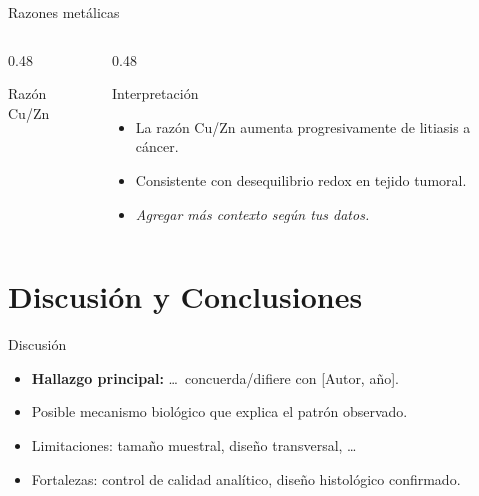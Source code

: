 \documentclass[aspectratio=169, 11pt]{beamer}
\begin{document}
\begin{frame}{Razones metálicas}
  \begin{columns}[T]
    \begin{column}{0.48\textwidth}
      \begin{center}
        {\small Razón Cu/Zn}
      \end{center}
    \end{column}
    \begin{column}{0.48\textwidth}
      \begin{exampleblock}{Interpretación}
        \begin{itemize}
          \item La razón Cu/Zn aumenta progresivamente de litiasis a cáncer.
          \item Consistente con desequilibrio redox en tejido tumoral.
          \item \textit{Agregar más contexto según tus datos.}
        \end{itemize}
      \end{exampleblock}
    \end{column}
  \end{columns}
\end{frame}

\section{Discusión y Conclusiones}

\begin{frame}{Discusión}
  \begin{itemize}
    \item \textbf{Hallazgo principal:} \ldots\ concuerda/difiere con [Autor, año].
    \item Posible mecanismo biológico que explica el patrón observado.
    \item Limitaciones: tamaño muestral, diseño transversal, \ldots
    \item Fortalezas: control de calidad analítico, diseño histológico confirmado.
  \end{itemize}
\end{frame}
\end{document}
